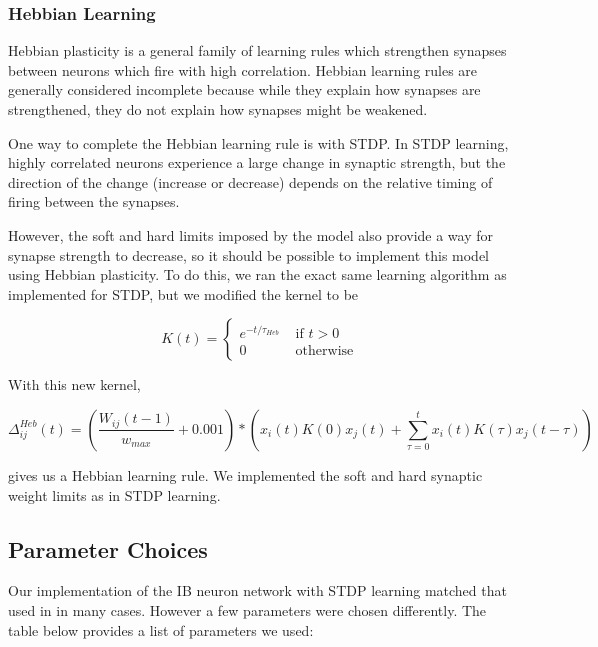 \subsubsection{Hebbian Learning}

Hebbian plasticity is a general family of learning rules which strengthen synapses between neurons which fire with high correlation. Hebbian learning rules are generally considered incomplete because while they explain how synapses are strengthened, they do not explain how synapses might be weakened. 

One way to complete the Hebbian learning rule is with STDP. In STDP learning, highly correlated neurons experience a large change in synaptic strength, but the direction of the change (increase or decrease) depends on the relative timing of firing between the synapses.

However, the soft and hard limits imposed by the model also provide a way for synapse strength to decrease, so it should be possible to implement this model using Hebbian plasticity. To do this, we ran the exact same learning algorithm as implemented for STDP, but we modified the kernel to be

\[K(t) = 
\begin{cases}
e^{-t/\tau_{Heb}} &\text{ if } t > 0\\
0 &\text{ otherwise}
\end{cases}
\]

With this new kernel, 

\begin{equation}
\Delta^{Heb}_{ij}(t) = \left(\frac{W_{ij}(t-1)}{w_{max}} + 0.001\right)*\left(x_i(t)K(0)x_j(t) + \sum_{\tau = 0}^t  x_i(t)K(\tau)x_j(t -\tau)\right)
\label{Heb}
\end{equation}

gives us a Hebbian learning rule. We implemented the soft and hard synaptic weight limits as in STDP learning.

\subsection{Parameter Choices}

Our implementation of the IB neuron network with STDP learning matched that used in \cite{Fiete} in many cases. However a few parameters were chosen differently. The table below provides a list of parameters we used:


